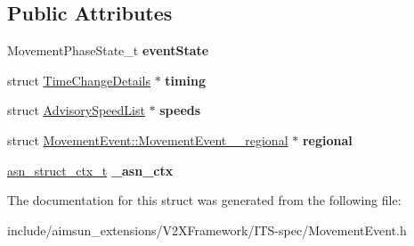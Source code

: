 \subsection*{Public Attributes}
\begin{DoxyCompactItemize}
\item 
Movement\+Phase\+State\+\_\+t {\bfseries event\+State}\hypertarget{structMovementEvent_a0144ea519a4d1a450ebed84e960acfbd}{}\label{structMovementEvent_a0144ea519a4d1a450ebed84e960acfbd}

\item 
struct \hyperlink{structTimeChangeDetails}{Time\+Change\+Details} $\ast$ {\bfseries timing}\hypertarget{structMovementEvent_a2367dad4ee64911b7d4cff6e0da567dc}{}\label{structMovementEvent_a2367dad4ee64911b7d4cff6e0da567dc}

\item 
struct \hyperlink{structAdvisorySpeedList}{Advisory\+Speed\+List} $\ast$ {\bfseries speeds}\hypertarget{structMovementEvent_a51b0434a5d5e5f03029bc105037ec834}{}\label{structMovementEvent_a51b0434a5d5e5f03029bc105037ec834}

\item 
struct \hyperlink{structMovementEvent_1_1MovementEvent____regional}{Movement\+Event\+::\+Movement\+Event\+\_\+\+\_\+regional} $\ast$ {\bfseries regional}\hypertarget{structMovementEvent_a0b5beb90ffe8eeefbab28a02b372d981}{}\label{structMovementEvent_a0b5beb90ffe8eeefbab28a02b372d981}

\item 
\hyperlink{structasn__struct__ctx__s}{asn\+\_\+struct\+\_\+ctx\+\_\+t} {\bfseries \+\_\+asn\+\_\+ctx}\hypertarget{structMovementEvent_a8cbc569a3d1994565895a260a5131ff4}{}\label{structMovementEvent_a8cbc569a3d1994565895a260a5131ff4}

\end{DoxyCompactItemize}


The documentation for this struct was generated from the following file\+:\begin{DoxyCompactItemize}
\item 
include/aimsun\+\_\+extensions/\+V2\+X\+Framework/\+I\+T\+S-\/spec/Movement\+Event.\+h\end{DoxyCompactItemize}
